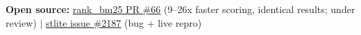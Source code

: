   \par\vspace{1pt}
  \small{\textbf{Open source:}
  \href{https://github.com/dorianbrown/rank_bm25/pull/66}{\underline{rank\_bm25 PR \#66}} (9--26x faster scoring, identical results; under review) $|$
  \href{https://github.com/whitphx/stlite/issues/2187}{\underline{stlite issue \#2187}} (bug + live repro)}
